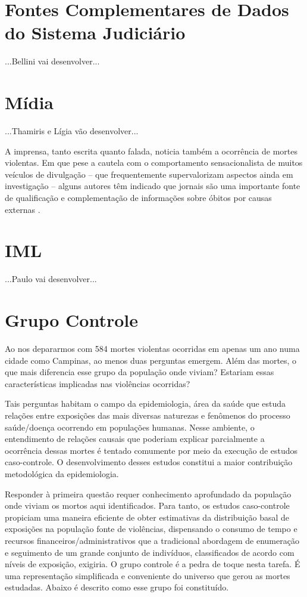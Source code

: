 \section{Fontes Complementares de Dados do Sistema Judiciário}

...Bellini vai desenvolver...

\section{Mídia}

...Thamiris e Lígia vão desenvolver...

A imprensa, tanto escrita quanto falada, noticia também a ocorrência de mortes violentas. Em que pese a cautela com o comportamento sensacionalista de muitos veículos de divulgação – que frequentemente supervalorizam aspectos ainda em investigação – alguns autores têm indicado que jornais são uma importante fonte de qualificação e complementação de informações sobre óbitos por causas externas \citep{souza2006acidentes, villela2012utilizaccao}.

\section{IML}

...Paulo vai desenvolver...

\section{Grupo Controle}

Ao nos depararmos com 584 mortes violentas ocorridas em apenas um ano numa cidade como Campinas, ao menos duas perguntas emergem. Além das mortes, o que mais diferencia esse grupo da população onde viviam? Estariam essas características implicadas nas violências ocorridas?

Tais perguntas habitam o campo da epidemiologia, área da saúde que estuda relações entre exposições das mais diversas naturezas e fenômenos do processo saúde/doença ocorrendo em populações humanas. Nesse ambiente, o entendimento de relações causais que poderiam explicar parcialmente a ocorrência dessas mortes é tentado comumente por meio da execução de estudos caso-controle. O desenvolvimento desses estudos constitui a maior contribuição metodológica da epidemiologia\citep{cordeiro2005mito}.

Responder à primeira questão requer conhecimento aprofundado da população onde viviam os mortos aqui identificados. Para tanto, os estudos caso-controle propiciam uma maneira eficiente de obter estimativas da distribuição basal de exposições na população fonte de violências, dispensando o consumo de tempo e recursos financeiros/administrativos que a tradicional abordagem de enumeração e seguimento de um grande conjunto de indivíduos, classificados de acordo com níveis de exposição, exigiria. O grupo controle é a pedra de toque nesta tarefa. É uma representação simplificada e conveniente do universo que gerou as mortes estudadas. Abaixo é descrito como esse grupo foi constituído.

